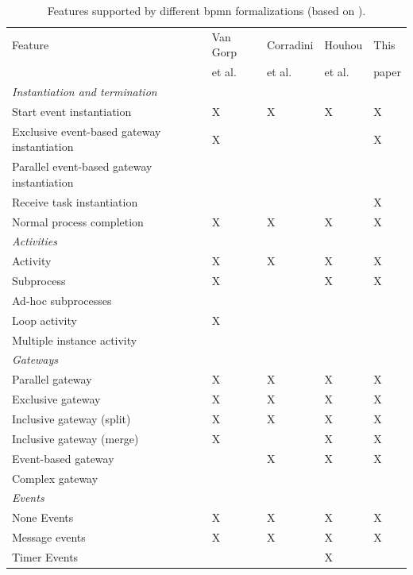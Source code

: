 \documentclass[runningheads]{llncs}
\begin{document}
\begin{table}[htbp]
    \caption{Features supported by different \gls*{bpmn} formalizations (based on \cite{vangorpVisualTokenbasedFormalization2013}).}
    \label{tab:supportedfeatures}
    \begin{threeparttable}
    \begin{tabular}{l l l l l}
    \hline
      Feature & Van Gorp &  Corradini & Houhou & This\\
      & et al. \cite{vangorpVisualTokenbasedFormalization2013} & et al. \cite{corradiniFormalApproachAnalysis2021}& et al. \cite{houhouFirstOrderLogicVerification2022} & paper\\
      \hline
      \textit{Instantiation and termination} & &\\
      Start event instantiation & X & X & X & X\\
      Exclusive event-based gateway instantiation & X & & & X\\
      Parallel event-based gateway instantiation &  & & & \\
      Receive task instantiation & & & & X\\
      Normal process completion & X & X & X & X\\
      \textit{Activities} & & & &\\
      Activity & X & X & X & X\\
      Subprocess & X & & X & X\\
      Ad-hoc subprocesses & & & &\\
      Loop activity & X & & &\\
      Multiple instance activity & & & & \\
      \textit{Gateways} & & & &\\
      Parallel gateway & X & X & X & X\\
      Exclusive gateway & X & X & X & X\\
      Inclusive gateway (split) & X & X & X & X\\
      Inclusive gateway (merge) & X & & X & X\\
      Event-based gateway &  & X\tnote{1} & X & X\\ %
      Complex gateway & & & &\\
      \textit{Events} & & & & \\
      None Events & X & X & X & X\\
      Message events & X & X & X & X\\
      Timer Events & & & X & \\

\end{tabular}
\end{threeparttable}
\end{table}
\end{document}
